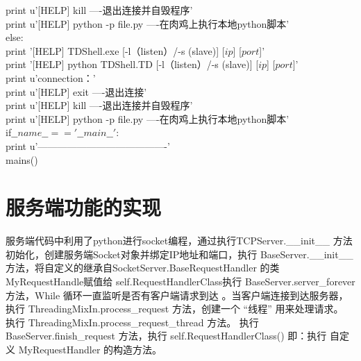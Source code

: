 \begin{breakablealgorithm}
\begin{algorithmic}[1]
			\qquad \qquad \qquad print \quad u'[HELP]  \quad kill  \quad   ----退出连接并自毁程序'\\
			
			\qquad \qquad \qquad print \quad u'[HELP]  \quad python \quad -p \quad file.py   \quad  ----在肉鸡上执行本地python脚本'\\
			
	\qquad else:\\
	
			\qquad \qquad \qquad print \quad '[HELP]  TDShell.exe [-l（listen）/-s (slave)] [$ip$] [$port$]'\\
			
			\qquad \qquad \qquad print \quad '[HELP]  python TDShell.TD [-l（listen）/-s (slave)] [$ip$] [$port$]'\\
			
			\qquad \qquad \qquad print \quad u'connection：'\\
			
			\qquad \qquad \qquad print \quad u'[HELP]  \quad exit   \quad  ----退出连接'\\
		
			\qquad \qquad \qquad print \quad u'[HELP]  \quad kill  \quad   ----退出连接并自毁程序'\\
			
			\qquad \qquad \qquad print \quad u'[HELP]  \quad python \quad -p \quad file.py   \quad  ----在肉鸡上执行本地python脚本'\\
if\quad $\_\_name\_\_=='\_\_main\_\_'$:\\
	\qquad print u'----------------------------------------'\\
	\qquad mains()
	\end{algorithmic}
\end{breakablealgorithm}


\section{服务端功能的实现}
服务端代码中利用了python进行socket编程，通过执行TCPServer.\_\_init\_\_ 方法初始化，创建服务端Socket对象并绑定IP地址和端口，执行 BaseServer.\_\_init\_\_ 方法，将自定义的继承自SocketServer.BaseRequestHandler 的类 MyRequestHandle赋值给 self.RequestHandlerClass执行 BaseServer.server\_forever 方法，While 循环一直监听是否有客户端请求到达\cite{6} 。当客户端连接到达服务器，执行 ThreadingMixIn.process\_request 方法，创建一个 “线程” 用来处理请求。
执行 ThreadingMixIn.process\_request\_thread 方法。
执行 BaseServer.finish\_request 方法，执行 self.RequestHandlerClass()  即：执行 自定义 MyRequestHandler 的构造方法。



